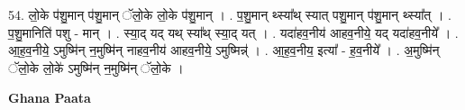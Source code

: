 \documentclass[17pt]{extarticle}
\begin{document}
54. लो॒के प॑शु॒मान् प॑शु॒मान् ॅलो॒के लो॒के प॑शु॒मान् । . प॒शु॒मान् थ्स्या᳚थ् स्यात् पशु॒मान् प॑शु॒मान् थ्स्या᳚त् । . प॒शु॒मानिति॑ पशु - मान् । . स्या॒द् यद् यथ् स्या᳚थ् स्या॒द् यत् । . यदा॑हव॒नीय॑ आहव॒नीये॒ यद् यदा॑हव॒नीये᳚ । . आ॒ह॒व॒नीये॒ ऽमुष्मि॑न् न॒मुष्मि॑न् नाहव॒नीय॑ आहव॒नीये॒ ऽमुष्मिन्न्॑ । . आ॒ह॒व॒नीय॒ इत्या᳚ - ह॒व॒नीये᳚ । . अ॒मुष्मि॑न् ॅलो॒के लो॒के॑ ऽमुष्मि॑न् न॒मुष्मि॑न् ॅलो॒के । \newline

\textbf{Ghana Paata } \newline
\end{document}
